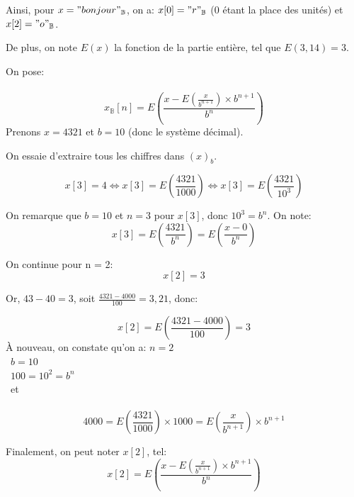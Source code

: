 \documentclass[a4paper, 12pt]{article}
\begin{document}
Ainsi, pour $x = "bonjour"_{\mathbb{B}}$,
on a: $x[0] = "r"_{\mathbb{B}}$ ($0$ étant la place des unités) et $x[2] = "o"_{\mathbb{B}}$.

De plus, on note $E(x)$ la fonction de la partie entière, tel que $E(3,14) = 3$.

On pose: \\\
\begin{equation}
x_{\mathbb{B}}[n] = E \left(\frac{x - E \left(\frac{x}{b^{n + 1}} \right) \times b^{n + 1}}{b^{n}} \right)
\end{equation}
\newpage
Prenons $x = 4321$ et $b = 10$ (donc le système décimal).


On essaie d'extraire tous les chiffres dans $(x)_{b}$.

\begin{equation}
x[3] = 4 \Leftrightarrow x[3] = E \left( \frac{4321}{1000} \right) \Leftrightarrow
x[3] = E \left( \frac{4321}{10^{3}} \right)
\end{equation}

On remarque que $b = 10$ et $n = 3$ pour $x[3]$, donc $10^{3} = b^{n}$. On note:
\begin{equation}
x[3] = E \left( \frac{4321}{b^n} \right) = E \left( \frac{x - 0}{b^n} \right)
\end{equation}

On continue pour n = 2:
\begin{equation}
x[2] = 3
\end{equation}

Or, $43 - 40 = 3$, soit $\frac{4321 - 4000}{100} = 3,21$, donc:

\begin{equation}
x[2] = E \left( \frac{4321 - 4000}{100} \right) = 3
\end{equation}
À nouveau, on constate qu'on a:
$n = 2$ \\\
$b = 10$ \\\
$100 = 10^2 = b^{n}$ \\\
et \\\
\begin{equation}
4000 = E \left( \frac{4321}{1000} \right) \times 1000 = E \left( \frac{x}{b^{n+1}} \right) \times b^{n+1}
\end{equation}

Finalement, on peut noter $x[2]$, tel:
\begin{equation}
x[2] = E \left( \frac{x - E \left( \frac{x}{b^{n+1}} \right) \times b^{n+1}}{b^{n}} \right)
\end{equation}
\end{document}
